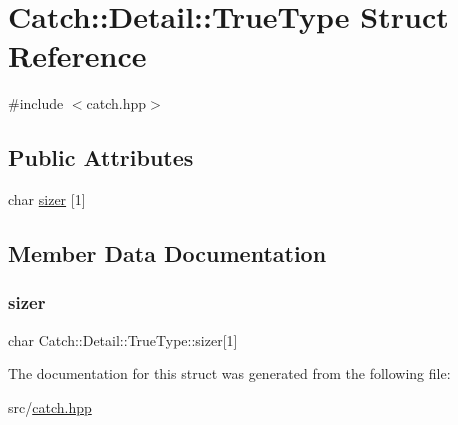 \hypertarget{struct_catch_1_1_detail_1_1_true_type}{}\section{Catch\+:\+:Detail\+:\+:True\+Type Struct Reference}
\label{struct_catch_1_1_detail_1_1_true_type}


{\ttfamily \#include $<$catch.\+hpp$>$}

\subsection*{Public Attributes}
\begin{DoxyCompactItemize}
\item 
char \hyperlink{struct_catch_1_1_detail_1_1_true_type_a3aaaeb75909e668b293c8a81f5fb6419}{sizer} \mbox{[}1\mbox{]}
\end{DoxyCompactItemize}


\subsection{Member Data Documentation}
\mbox{\label{struct_catch_1_1_detail_1_1_true_type_a3aaaeb75909e668b293c8a81f5fb6419}} 
\subsubsection{\texorpdfstring{sizer}{sizer}}
{\footnotesize\ttfamily char Catch\+::\+Detail\+::\+True\+Type\+::sizer\mbox{[}1\mbox{]}}



The documentation for this struct was generated from the following file\+:\begin{DoxyCompactItemize}
\item 
src/\hyperlink{catch_8hpp}{catch.\+hpp}\end{DoxyCompactItemize}
